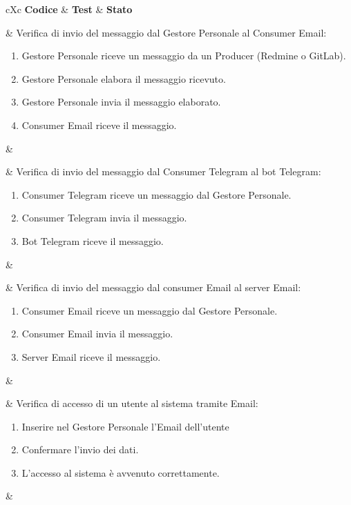 \begin{table}[H]
	\begin{VTtable}[1.7]{\textwidth}{cXc}
		\rowcolor{\tablegray}
		\textbf{Codice} & \centering\textbf{Test} & \textbf{Stato} \\\toprule

        \addtotv & Verifica di invio del messaggio dal Gestore Personale al Consumer Email:
        \begin{enumerate}
            \item Gestore Personale riceve un messaggio da un Producer (Redmine o GitLab).
            \item Gestore Personale elabora il messaggio ricevuto.
            \item Gestore Personale invia il messaggio elaborato.
            \item Consumer Email riceve il messaggio.
        \end{enumerate}
        & \TNI \\\midrule

        \addtotv & Verifica di invio del messaggio dal Consumer Telegram al bot Telegram:
        \begin{enumerate}
            \item Consumer Telegram riceve un messaggio dal Gestore Personale.
            \item Consumer Telegram invia il messaggio.
            \item Bot Telegram riceve il messaggio.
        \end{enumerate}
        & \TNI \\\midrule

        \addtotv & Verifica di invio del messaggio dal consumer Email al server Email:
        \begin{enumerate}
            \item Consumer Email riceve un messaggio dal Gestore Personale.
            \item Consumer Email invia il messaggio.
            \item Server Email riceve il messaggio.
        \end{enumerate}
        & \TNI \\\midrule

        \addtotv & Verifica di accesso di un utente al sistema tramite Email:
        \begin{enumerate}
            \item Inserire nel Gestore Personale l'Email dell'utente
            \item Confermare l'invio dei dati.
            \item L'accesso al sistema è avvenuto correttamente.
        \end{enumerate}
        & \TNI \\\midrule


\end{VTtable}
\end{table}
